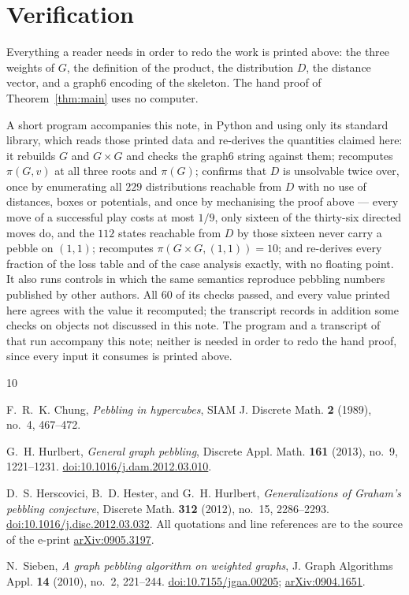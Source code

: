 \documentclass[11pt]{amsart}
\theoremstyle{definition}
\begin{document}
\section{Verification}

Everything a reader needs in order to redo the work is printed above: the
three weights of $G$, the definition of the product, the distribution $D$,
the distance vector, and a graph6 encoding of the skeleton. The hand proof of
Theorem~\ref{thm:main} uses no computer.

A short program accompanies this note, in Python and using only its standard
library, which reads those printed data and re-derives the quantities claimed
here: it rebuilds $G$ and $G\times G$ and checks the graph6 string against
them; recomputes $\pi(G,v)$ at all three roots and $\pi(G)$; confirms that
$D$ is unsolvable twice over, once by enumerating all $229$ distributions
reachable from $D$ with no use of distances, boxes or potentials, and once by
mechanising the proof above --- every move of a successful play costs at most
$1/9$, only sixteen of the thirty-six directed moves do, and the $112$ states
reachable from $D$ by those sixteen never carry a pebble on $(1,1)$;
recomputes $\pi(G\times G,(1,1))=10$; and re-derives every fraction of the
loss table and of the case analysis exactly, with no floating point. It also
runs controls in which the same semantics reproduce pebbling numbers
published by other authors. All $60$ of its checks passed, and every value
printed here agrees with the value it recomputed; the transcript records in
addition some checks on objects not discussed in this note. The program and a
transcript of that run accompany this note; neither is needed in order to redo
the hand proof, since every input it consumes is printed above.

\begin{thebibliography}{10}

F.~R.~K. Chung,
\emph{Pebbling in hypercubes},
SIAM J. Discrete Math. \textbf{2} (1989), no.~4, 467--472.

G.~H. Hurlbert,
\emph{General graph pebbling},
Discrete Appl. Math. \textbf{161} (2013), no.~9, 1221--1231.
\href{https://doi.org/10.1016/j.dam.2012.03.010}{doi:10.1016/j.dam.2012.03.010}.

D.~S. Herscovici, B.~D. Hester, and G.~H. Hurlbert,
\emph{Generalizations of Graham's pebbling conjecture},
Discrete Math. \textbf{312} (2012), no.~15, 2286--2293.
\href{https://doi.org/10.1016/j.disc.2012.03.032}{doi:10.1016/j.disc.2012.03.032}.
All quotations and line references are to the source of the e-print
\href{https://arxiv.org/abs/0905.3197}{arXiv:0905.3197}.

N.~Sieben,
\emph{A graph pebbling algorithm on weighted graphs},
J. Graph Algorithms Appl. \textbf{14} (2010), no.~2, 221--244.
\href{https://doi.org/10.7155/jgaa.00205}{doi:10.7155/jgaa.00205};
\href{https://arxiv.org/abs/0904.1651}{arXiv:0904.1651}.

\end{thebibliography}
\end{document}
